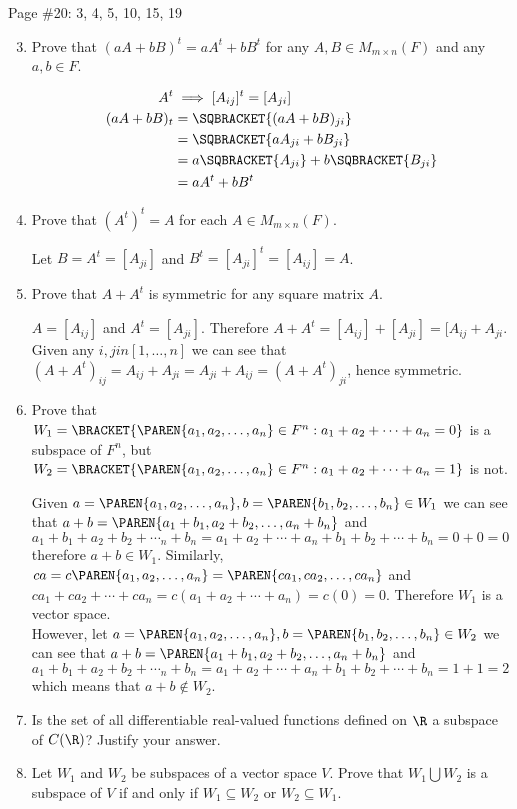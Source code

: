 \documentclass[10pt,a4paper]{report}
\newcommand{\MMN}{M_{m\times n}}
\begin{document}
Page \#20: 3, 4, 5, 10, 15, 19
\begin{enumerate}
	\setcounter{enumi}{2}
	\item Prove that $(aA+bB)^t = aA^t+bB^t$ for any $A,B\in \MMN(F)$ and any $a,b \in F$.
	
	\begin{align*}
		A^t &\implies [A_{ij}]^t = [A_{ji}] \\
		(aA+bB)_t &= \SQBRACKET{(aA + bB)_{ji}} \\
		 &= \SQBRACKET{ aA_{ji}+bB_{ji} } \\
		 &= a\SQBRACKET{A_{ji}}+b\SQBRACKET{B_{ji}} \\
		 &= aA^t + bB^t
	\end{align*}
	
	\item Prove that $(A^t)^t=A$ for each $A \in \MMN(F)$.
	
	Let $B = A^t = [A_{ji}]$ and $B^t = [A_{ji}]^t = [A_{ij}] = A$.
	
	\item Prove that $A+A^t$ is symmetric for any square matrix $A$.
	
	$A = [A_{ij}]$ and $A^t = [A_{ji}]$.  Therefore $A+A^t = [A_{ij}]+[A_{ji}]=[A_{ij}+A_{ji}$.  Given any $i, j in [1, \dots, n]$ we can see that $(A+A^t)_{ij}=A_{ij}+A_{ji}=A_{ji}+A_{ij}=(A+A^t)_{ji}$, hence symmetric.
	
	\setcounter{enumi}{9}
	\item Prove that $W_1= \BRACKET{\PAREN{a_1,a_2,\dots, a_n} \in F^n: a_1+a_2+\cdots+a_n=0}$ is a subspace of $F^n$, but $W_2= \BRACKET{\PAREN{a_1,a_2,\dots, a_n} \in F^n: a_1+a_2+\cdots+a_n=1}$ is not.
	
	Given $a=\PAREN{a_1,a_2,\dots, a_n},b=\PAREN{b_1,b_2,\dots, b_n} \in W_1$ we can see that $a+b = \PAREN{a_1+b_1, a_2+b_2, \dots, a_n+b_n}$ and $a_1+b_1+a_2+b_2+\cdots_n+b_n = a_1+a_2+\cdots+a_n+b_1+b_2+\cdots+b_n=0+0=0$ therefore $a+b \in W_1$.  Similarly, $ca = c\PAREN{a_1,a_2,\dots, a_n}= \PAREN{ca_1,ca_2,\dots, ca_n}$ and $ca_1+ca_2+\cdots+ca_n= c(a_1+a_2+\cdots+a_n)=c(0)=0.$ Therefore $W_1$ is a vector space. \\
	However, let $a=\PAREN{a_1,a_2,\dots, a_n},b=\PAREN{b_1,b_2,\dots, b_n} \in W_2$ we can see that $a+b = \PAREN{a_1+b_1, a_2+b_2, \dots, a_n+b_n}$ and $a_1+b_1+a_2+b_2+\cdots_n+b_n = a_1+a_2+\cdots+a_n+b_1+b_2+\cdots+b_n=1+1=2$ which means that $a+b \not \in W_2$.
	\setcounter{enumi}{14}
	\item  Is the set of all differentiable real-valued functions defined on $\R$ a subspace of $C(\R)$?  Justify your answer.
	\setcounter{enumi}{18}
	\item Let $W_1$ and $W_2$ be subspaces of a vector space $V$.  Prove that $W_1 \bigcup W_2$ is a subspace of $V$ if and only if $W_1 \subseteq W_2$ or $W_2 \subseteq W_1$.
	
\end{enumerate}
\end{document}
